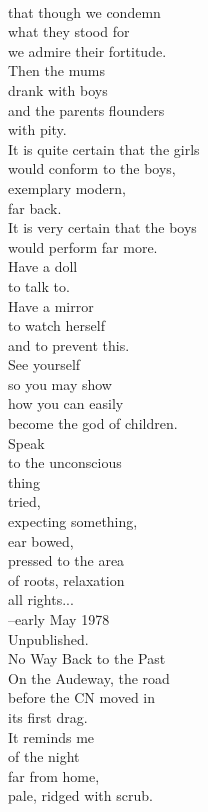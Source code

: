\documentclass[smalldemyvopaper,11pt,twoside,onecolumn,openright,extrafontsizes]{memoir}
\begin{document}
\\that though we condemn
\\what they stood for
\\we admire their fortitude.
\\Then the mums
\\drank with boys
\\and the parents flounders
\\with pity.
\\It is quite certain that the girls
\\would conform to the boys,
\\exemplary modern,
\\far back.
\\It is very certain that the boys
\\would perform far more.
\\Have a doll
\\to talk to.
\\Have a mirror
\\to watch herself
\\and to prevent this.
\\See yourself
\\so you may show
\\how you can easily
\\become the god of children.
\\Speak
\\to the unconscious
\\thing
\\tried,
\\expecting something,
\\ear bowed,
\\pressed to the area
\\of roots, relaxation
\\all rights...
\\--early May 1978
\\Unpublished.
\\No Way Back to the Past
\\On the Audeway, the road
\\before the CN moved in
\\its first drag.
\\It reminds me
\\of the night
\\far from home,
\\pale, ridged with scrub.
\end{document}
